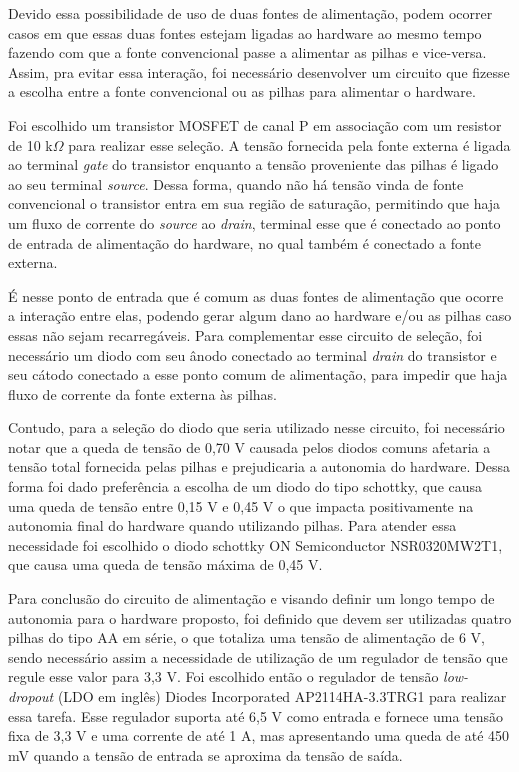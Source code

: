 Devido essa possibilidade de uso de duas fontes de alimentação, podem ocorrer casos em que essas duas fontes estejam ligadas ao hardware ao mesmo tempo fazendo com que a fonte convencional passe a alimentar as pilhas e vice-versa. Assim, pra evitar essa interação, foi necessário desenvolver um circuito que fizesse a escolha entre a fonte convencional ou as pilhas para alimentar o hardware. 

Foi escolhido um transistor MOSFET de canal P em associação com um resistor de 10 k$\Omega$ para realizar esse seleção. A tensão fornecida pela fonte externa é ligada ao terminal \textit{gate} do transistor enquanto a tensão proveniente das pilhas é ligado ao seu terminal \textit{source}. Dessa forma, quando não há tensão vinda de fonte convencional o transistor entra em sua região de saturação, permitindo que haja um fluxo de corrente do \textit{source} ao \textit{drain}, terminal esse que é conectado ao ponto de entrada de alimentação do hardware, no qual também é conectado a fonte externa. 

É nesse ponto de entrada que é comum as duas fontes de alimentação que ocorre a interação entre elas, podendo gerar algum dano ao hardware e/ou as pilhas caso essas não sejam recarregáveis. Para complementar esse circuito de seleção, foi necessário um diodo com seu ânodo conectado ao terminal \textit{drain} do transistor e seu cátodo conectado a esse ponto comum de alimentação, para impedir que haja fluxo de corrente da fonte externa às pilhas. 

Contudo, para a seleção do diodo que seria utilizado nesse circuito, foi necessário notar que a queda de tensão de 0,70 V causada pelos diodos comuns afetaria a tensão total fornecida pelas pilhas e prejudicaria a autonomia do hardware. Dessa forma foi dado preferência a escolha de um diodo do tipo schottky, que causa uma queda de tensão entre 0,15 V e 0,45 V o que impacta positivamente na autonomia final do hardware quando utilizando pilhas. Para atender essa necessidade foi escolhido o diodo schottky ON Semiconductor NSR0320MW2T1, que causa uma queda de tensão máxima de 0,45 V.

Para conclusão do circuito de alimentação e visando definir um longo tempo de autonomia para o hardware proposto, foi definido que devem ser utilizadas quatro pilhas do tipo AA em série, o que totaliza uma tensão de alimentação de 6 V, sendo necessário assim a necessidade de utilização de um regulador de tensão que regule esse valor para 3,3 V. Foi escolhido então o regulador de tensão \textit{low-dropout} (LDO em inglês) Diodes Incorporated AP2114HA-3.3TRG1 para realizar essa tarefa. Esse regulador suporta até 6,5 V como entrada e fornece uma tensão fixa de 3,3 V e uma corrente de até 1 A, mas apresentando uma queda de até 450 mV quando a tensão de entrada se aproxima da tensão de saída. 

